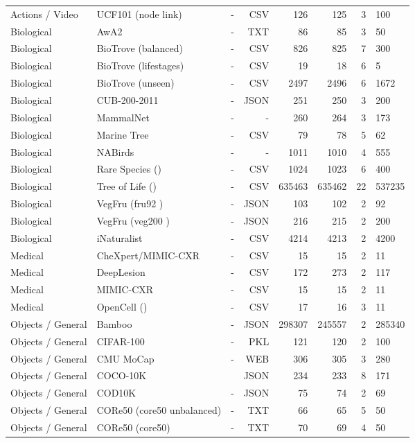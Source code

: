 \begin{table}
\begin{tabular}{lll|rrrr}
Actions / Video & UCF101 (node link) & - & CSV & 126 & 125 & 3 & 100 \\
Biological & AwA2 & - & TXT & 86 & 85 & 3 & 50 \\
Biological & BioTrove (balanced) & - & CSV & 826 & 825 & 7 & 300 \\
Biological & BioTrove (lifestages) & - & CSV & 19 & 18 & 6 & 5 \\
Biological & BioTrove (unseen) & - & CSV & 2497 & 2496 & 6 & 1672 \\
Biological & CUB-200-2011 & - & JSON & 251 & 250 & 3 & 200 \\
Biological & MammalNet & - & - & 260 & 264 & 3 & 173 \\
Biological & Marine Tree & - & CSV & 79 & 78 & 5 & 62 \\
Biological & NABirds & - & - & 1011 & 1010 & 4 & 555 \\
Biological & Rare Species () & - & CSV & 1024 & 1023 & 6 & 400 \\
Biological & Tree of Life () & - & CSV & 635463 & 635462 & 22 & 537235 \\
Biological & VegFru (fru92 ) & - & JSON & 103 & 102 & 2 & 92 \\
Biological & VegFru (veg200 ) & - & JSON & 216 & 215 & 2 & 200 \\
Biological & iNaturalist & - & CSV & 4214 & 4213 & 2 & 4200 \\
Medical & CheXpert/MIMIC-CXR & - & CSV & 15 & 15 & 2 & 11 \\
Medical & DeepLesion & - & CSV & 172 & 273 & 2 & 117 \\
Medical & MIMIC-CXR & - & CSV & 15 & 15 & 2 & 11 \\
Medical & OpenCell () & - & CSV & 17 & 16 & 3 & 11 \\
Objects / General & Bamboo & - & JSON & 298307 & 245557 & 2 & 285340 \\
Objects / General & CIFAR-100 & - & PKL & 121 & 120 & 2 & 100 \\
Objects / General & CMU MoCap & - & WEB & 306 & 305 & 3 & 280 \\
Objects / General & COCO-10K & \cite{atigh2022hyperbolic} & JSON & 234 & 233 & 8 & 171 \\
Objects / General & COD10K & - & JSON & 75 & 74 & 2 & 69 \\
Objects / General & CORe50 (core50 unbalanced) & - & TXT & 66 & 65 & 5 & 50 \\
Objects / General & CORe50 (core50) & - & TXT & 70 & 69 & 4 & 50 \\

\end{tabular}
\end{table}
